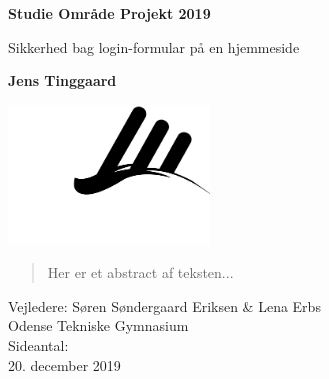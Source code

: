 \begin{titlepage}
   \begin{center}

       \Large
       \textbf{Studie Område Projekt 2019}

        \vspace{0.5cm}
        \large
        Sikkerhed bag login-formular på en hjemmeside

       \vspace{1cm}
       \large
       \textbf{Jens Tinggaard}

       \vspace{1cm}
       {\hspace{-2cm}\includegraphics[width=0.4\textwidth]{img/otg_logo.png}}

       \vspace{-0.5cm}
       \begin{abstract}
           Her er et abstract af teksten...
       \end{abstract}

       \vfill

       Vejledere: Søren Søndergaard Eriksen \& Lena Erbs\\
       Odense Tekniske Gymnasium\\
       Sideantal: \pageref{LastPage}\\
       20. december 2019
   \end{center}
\end{titlepage}

